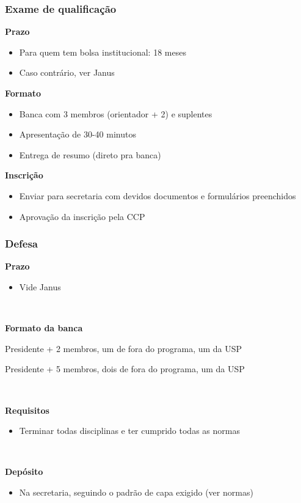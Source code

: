 \documentclass{beamer}
\begin{document}
\begin{frame}
  \frametitle{Exame de qualificação}

  \textbf{Prazo}
  \begin{itemize}
    \item Para quem tem bolsa institucional: 18 meses
    \item Caso contrário, ver Janus
  \end{itemize}\pause

  \textbf{Formato}
  \begin{itemize}
    \item Banca com 3 membros (orientador + 2) e suplentes
    \item Apresentação de 30-40 minutos
    \item Entrega de resumo (direto pra banca)
  \end{itemize}\pause

  \textbf{Inscrição}
  \begin{itemize}
    \item Enviar para secretaria com devidos documentos e formulários preenchidos
    \item Aprovação da inscrição pela CCP
  \end{itemize}
\end{frame}

\begin{frame}
  \frametitle{Defesa}

  \textbf{Prazo}
  \begin{itemize}
    \item Vide Janus
  \end{itemize}~\\\pause

  \textbf{Formato da banca}
  \begin{description}[Doutorado]
    \item[Mestrado:] Presidente + 2 membros, um de fora do programa, um da USP
    \item[Doutorado:] Presidente + 5 membros, dois de fora do programa, um da USP
  \end{description}~\\\pause

  \textbf{Requisitos}
  \begin{itemize}
    \item Terminar todas disciplinas e ter cumprido todas as normas
  \end{itemize}~\\\pause

  \textbf{Depósito}
  \begin{itemize}
    \item Na secretaria, seguindo o padrão de capa exigido (ver normas)
  \end{itemize}
\end{frame}
\end{document}
